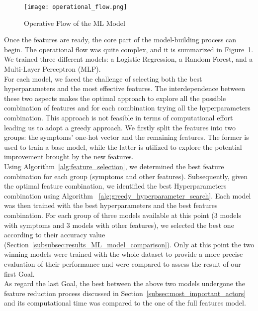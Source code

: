 \begin{figure}[t]
	\centering
	\texttt{[image: operational\_flow.png]}
	\caption{Operative Flow of the ML Model}\label{fig:ML_operative_flow}
\end{figure}

\noindent
Once the features are ready, the core part of the model-building process can begin. The operational flow was quite complex,
and it is summarized in Figure~\ref{fig:ML_operative_flow}.\\
We trained three different models: a Logistic Regression, a Random Forest, and a Multi-Layer Perceptron (MLP).\\
For each model, we faced the challenge of selecting both the best hyperparameters and the most effective features.
The interdependence between these two aspects makes the optimal approach to explore all the possible combination of features
and for each combination trying all the hyperparameters combination. This approach is not feasible in terms of computational effort
leading us to adopt a greedy approach. We firstly split the features into two
groups: the symptoms' one-hot vector and the remaining features. The former is used to train a base model,
while the latter is utilized to explore the potential improvement brought by the new features.\\
Using Algorithm~\ref{alg:feature_selection}, we determined the best feature combination for each group (symptoms and other features).
Subsequently, given the optimal feature combination, we identified the best Hyperparameters combination using Algorithm
~\ref{alg:greedy_hyperparameter_search}. Each model was then trained with the best hyperparameters and the best features combination.
For each group of three models available at this point (3 models with symptoms and 3 models with other features), we selected the best one
according to their accuracy value (Section~\ref{subsubsec:results_ML_model_comparison}).
Only at this point the two winning models were trained with the whole dataset to provide a more precise evaluation of their performance and
were compared to assess the result of our first Goal.\\
As regard the last Goal, the best between the above two models undergone the feature reduction process
discussed in Section~\ref{subsec:most_important_actors} and its computational time was compared to the one of the full features model.\\

